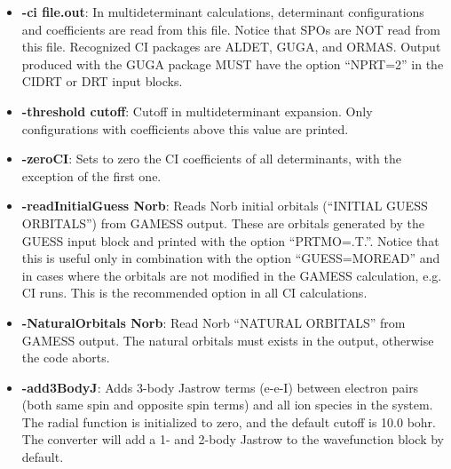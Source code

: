 {\begin{itemize}
\item{\textbf{-ci file.out}: In multideterminant calculations, determinant configurations and 
coefficients are read from this file. Notice that SPOs are NOT read
from this file. Recognized CI packages are ALDET, GUGA, and ORMAS. Output
produced with the GUGA package MUST have the option “NPRT=2” in the CIDRT
or DRT input blocks.}

\item{\textbf{-threshold cutoff}: Cutoff in multideterminant expansion. Only configurations with
coefficients above this value are printed.}

\item{\textbf{-zeroCI}: Sets to zero the CI coefficients of all determinants, with the exception of the
first one.}

\item{\textbf{-readInitialGuess Norb}: Reads Norb initial orbitals (“INITIAL GUESS ORBITALS”) 
from GAMESS output. These are orbitals generated by the GUESS input
block and printed with the option “PRTMO=.T.”. Notice that this is useful only in
combination with the option “GUESS=MOREAD” and in cases where the orbitals
are not modified in the GAMESS calculation, e.g. CI runs. This is the recommended
option in all CI calculations.}

\item{\textbf{-NaturalOrbitals Norb}: Read Norb “NATURAL ORBITALS” from GAMESS
output. The natural orbitals must exists in the output, otherwise the code aborts.}

\item{\textbf{-add3BodyJ}: Adds 3-body Jastrow terms (e-e-I) between electron pairs (both
same spin and opposite spin terms) and all ion species in the system. The radial
function is initialized to zero, and the default cutoff is 10.0 bohr. The converter will
add a 1- and 2-body Jastrow to the wavefunction block by default.}
\end{itemize}

}
